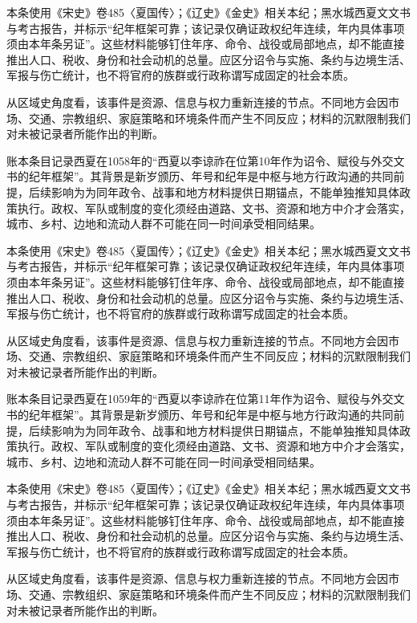 本条使用《宋史》卷485〈夏国传〉；《辽史》《金史》相关本纪；黑水城西夏文文书与考古报告，并标示“纪年框架可靠；该记录仅确证政权纪年连续，年内具体事项须由本年条另证”。这些材料能够钉住年序、命令、战役或局部地点，却不能直接推出人口、税收、身份和社会动机的总量。应区分诏令与实施、条约与边境生活、军报与伤亡统计，也不将官府的族群或行政称谓写成固定的社会本质。

从区域史角度看，该事件是资源、信息与权力重新连接的节点。不同地方会因市场、交通、宗教组织、家庭策略和环境条件而产生不同反应；材料的沉默限制我们对未被记录者所能作出的判断。

账本条目记录西夏在1058年的“西夏以李谅祚在位第10年作为诏令、赋役与外交文书的纪年框架”。其背景是新岁颁历、年号和纪年是中枢与地方行政沟通的共同前提，后续影响为为同年政令、战事和地方材料提供日期锚点，不能单独推知具体政策执行。政权、军队或制度的变化须经由道路、文书、资源和地方中介才会落实，城市、乡村、边地和流动人群不可能在同一时间承受相同结果。

本条使用《宋史》卷485〈夏国传〉；《辽史》《金史》相关本纪；黑水城西夏文文书与考古报告，并标示“纪年框架可靠；该记录仅确证政权纪年连续，年内具体事项须由本年条另证”。这些材料能够钉住年序、命令、战役或局部地点，却不能直接推出人口、税收、身份和社会动机的总量。应区分诏令与实施、条约与边境生活、军报与伤亡统计，也不将官府的族群或行政称谓写成固定的社会本质。

从区域史角度看，该事件是资源、信息与权力重新连接的节点。不同地方会因市场、交通、宗教组织、家庭策略和环境条件而产生不同反应；材料的沉默限制我们对未被记录者所能作出的判断。

账本条目记录西夏在1059年的“西夏以李谅祚在位第11年作为诏令、赋役与外交文书的纪年框架”。其背景是新岁颁历、年号和纪年是中枢与地方行政沟通的共同前提，后续影响为为同年政令、战事和地方材料提供日期锚点，不能单独推知具体政策执行。政权、军队或制度的变化须经由道路、文书、资源和地方中介才会落实，城市、乡村、边地和流动人群不可能在同一时间承受相同结果。

本条使用《宋史》卷485〈夏国传〉；《辽史》《金史》相关本纪；黑水城西夏文文书与考古报告，并标示“纪年框架可靠；该记录仅确证政权纪年连续，年内具体事项须由本年条另证”。这些材料能够钉住年序、命令、战役或局部地点，却不能直接推出人口、税收、身份和社会动机的总量。应区分诏令与实施、条约与边境生活、军报与伤亡统计，也不将官府的族群或行政称谓写成固定的社会本质。

从区域史角度看，该事件是资源、信息与权力重新连接的节点。不同地方会因市场、交通、宗教组织、家庭策略和环境条件而产生不同反应；材料的沉默限制我们对未被记录者所能作出的判断。

